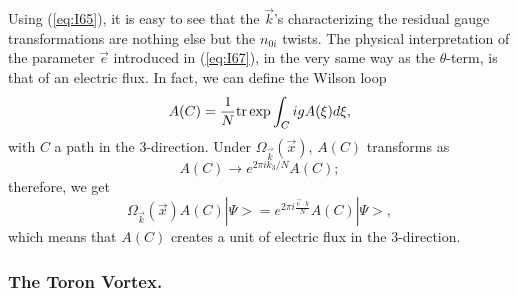 Using (\ref{eq:I65}), it is easy to see that the $\vec{k}$'s
characterizing the residual gauge transformations are nothing
else but the $n_{0i}$ twists. The physical interpretation of the
parameter $\vec{e}$ introduced in (\ref{eq:I67}), in the very
same way as the $\theta$-term, is that of an electric flux. In fact,
we can define the Wilson loop
\begin{equation}
A(C) = \frac {1}{N} \hbox {tr} \exp \int_C i g A(\xi) d \xi,
\label{eq:I70}
\end{equation}
with $C$ a path in the $3$-direction. Under
$\Omega_{\vec{k}}(\vec{x})$, $A(C)$ transforms as 
\begin{equation}
A(C) \rightarrow e^{2 \pi i k_3/N} A(C);
\label{eq:I71}
\end{equation}
therefore, we get
\begin{equation}
\Omega_{\vec{k}}(\vec{x}) A(C) |\Psi> = e^{2 \pi i \frac {\vec{e}
\cdot {k}}{N}} A(C) |\Psi>,
\label{eq:I72}
\end{equation}
which means that $A(C)$ creates a unit of electric flux in the $3$-direction.
  

\subsubsection{The Toron Vortex.}
\label{sec:51}

